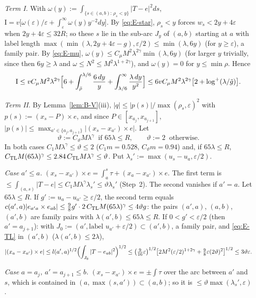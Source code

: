 \emph{Term \textup{I}.} With $\omega(y):=\int_{\{s\in(a,b):\,\rho_s<y\}}|T-e|^2ds$,
$\mathrm I=v\bigl[\omega(\varepsilon)/\varepsilon+\int_\varepsilon^\infty\omega(y)y^{-2}dy\bigr]$. By \eqref{eq:E-star}, $\rho_s<y$
forces $w_s<2y+4\varepsilon$ when $2y+4\varepsilon\le32R$; so these $s$ lie in the sub-arc $J_y$ of $(a,b)$ starting at $a$ with
label length $\max(\min(\lambda,2y+4\varepsilon-g),\varepsilon/2)\le\min(\lambda,6y)$ (for $y\ge\varepsilon$), a family pair. By
\eqref{eq:E-mu}, $\omega(y)\le C_\mu M^2\lambda^{2\gamma}\min(\lambda,6y)$ (for larger $y$ trivially, since then $6y\ge\lambda$ and
$\omega\le N^2\le M^2\lambda^{1+2\gamma}$), and $\omega(y)=0$ for $y\le\min\rho$. Hence
\[
\mathrm I\le vC_\mu M^2\lambda^{2\gamma}\Bigl[6+\int_{\bar\rho}^{\lambda/6}\frac{6\,dy}y+\int_{\lambda/6}^\infty\frac{\lambda\,dy}{y^2}\Bigr]
\le6vC_\mu M^2\lambda^{2\gamma}\bigl[2+\log^+(\lambda/\tilde g)\bigr].
\]

\emph{Term \textup{II}.} By Lemma~\ref{lem:B-V}(iii), $|q|\le|p(s)|/\max(\rho_s,\varepsilon)^2$ with $p(s):=(x_s-P)\times e$, and
since $P\in[x_{a_j},x_{a_{j+1}}]$, $|p(s)|\le\max_{a'\in\{a_j,a_{j+1}\}}|(x_s-x_{a'})\times e|$. Let
\[
\vartheta:=C_\vartheta M\lambda^\gamma\ \text{ if }65\lambda\le R,\qquad\vartheta:=2\ \text{ otherwise.}
\]
In both cases $C_1M\lambda^\gamma\le\vartheta\le2$ ($C_1m=0.528$, $C_\vartheta m=0.94$) and, if $65\lambda\le R$,
$C_{\mathrm{TL}} M(65\lambda)^\gamma\le2.84\,C_{\mathrm{TL}} M\lambda^\gamma\le\vartheta$. Put $\lambda_s':=\max(u_s-u_a,\varepsilon/2)$.

\emph{Case $a'\le a$.} $(x_s-x_{a'})\times e=\int_a^s\tau+(x_a-x_{a'})\times e$. The first term is
$\le\int_{(a,s)}|T-e|\le C_1M\lambda^\gamma\lambda_s'\le\vartheta\lambda_s'$ (Step~2). The second vanishes if $a'=a$. Let
$65\lambda\le R$. If $g':=u_a-u_{a'}\ge\varepsilon/2$, the second term equals
$c(a',a)|e_{a'a}\times e_{ab}|\le\frac98g'\cdot2\,C_{\mathrm{TL}} M(65\lambda)^\gamma\le4\vartheta g$: the pairs $(a',a)$, $(a,b)$, $(a',b)$
are family pairs with $\lambda(a',b)\le65\lambda\le R$. If $0<g'<\varepsilon/2$ (then $a'=a_{j+1}$): with
$J_0:=(a',\text{label }u_{a'}+\varepsilon/2)\subset(a',b)$, a family pair, and \eqref{eq:E-TL} in $(a',b)$
($\lambda(a',b)\le2\lambda$),
\[
|(x_a-x_{a'})\times e|\le l(a',a)^{1/2}\Bigl(\int_{J_0}|T-e_{ab}|^2\Bigr)^{1/2}
\le\bigl(\tfrac9{16}\varepsilon\bigr)^{1/2}\bigl[2M^2(\varepsilon/2)^{1+2\gamma}+\tfrac98\varepsilon(2\vartheta)^2\bigr]^{1/2}
\le3\vartheta\varepsilon .
\]

\emph{Case $a=a_j$, $a'=a_{j+1}\le b$.} $(x_s-x_{a'})\times e=\pm\int\tau$ over the arc between $a'$ and $s$, which is contained in
$(a,\max(s,a'))\subset(a,b)$; so it is $\le\vartheta\max(\lambda_s',\varepsilon)$.

